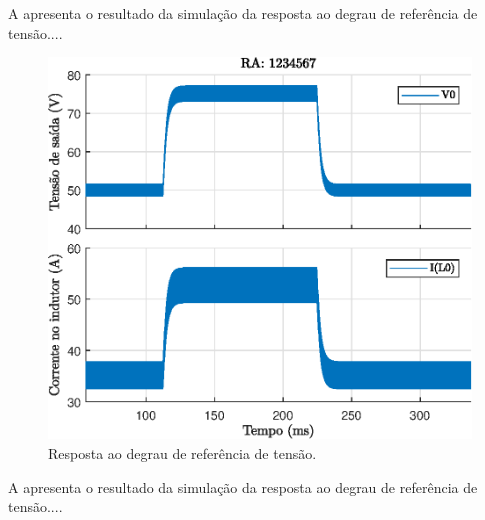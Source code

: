 







A  apresenta o resultado da simulação da resposta ao degrau de referência de tensão....

\begin{figure}[!ht]
	\centering
	\includegraphics[width=0.9\linewidth]{Figs/Buck1malha}
	\caption{Resposta ao degrau de referência de tensão.}
	\label{fig:buck1malha}
\end{figure}




A  apresenta o resultado da simulação da resposta ao degrau de referência de tensão....

